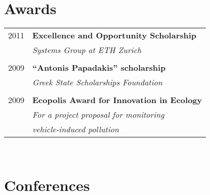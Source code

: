 \documentclass[10pt]{article} %
\begin{document}
\begin{minipage}[t]{0.44\textwidth}
\begin{tabular}{ll}
\end{tabular}




\section{Awards} 

\begin{tabular}{rl}
2011	 & \textbf{Excellence and Opportunity Scholarship}\\
& \textit{Systems Group at ETH Zurich}\\ \\


2009	 & \textbf{``Antonis Papadakis'' scholarship
}\\
& \textit{Greek State Scholarships
Foundation}\\ \\


2009	& \textbf{Ecopolis Award for Innovation in Ecology
}\\
& \textit{For a project proposal for monitoring}\\
& \textit{vehicle-induced pollution}\\

\end{tabular}\\[10pt]





\section{Conferences} 


\end{minipage}
\end{document}
